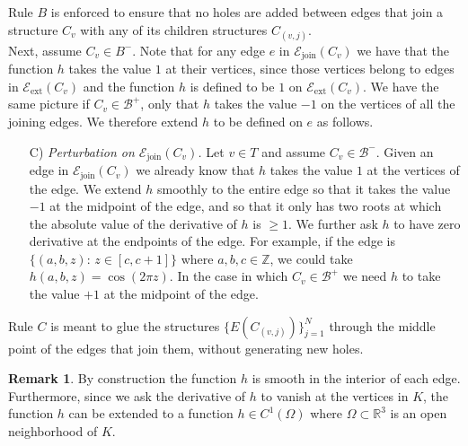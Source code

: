 \documentclass[11pt,reqno]{amsart}
\newcommand{\R}{{\mathbb R}}
\newcommand{\Z}{{\mathbb Z}}
\theoremstyle{definition}
\newtheorem{remark}{Remark}
\begin{document}
\noindent Rule $B$ is enforced to ensure that no holes are added between edges that join a structure $C_v$ with any of its children structures $C_{(v,j)}$.\\

Next, assume $C_v \mathcal \in B^-$. Note that for any edge $e$ in  $\mathcal E_{\text{join}}(C_v)$ we  have that the function $h$ takes the value $1$ at their vertices, since those vertices belong to edges in $ \mathcal E_{\text{ext}}(C_v)$ and the function $h$ is defined to be $1$ on $ \mathcal E_{\text{ext}}(C_v)$. We have the same picture if  $C_v \in \mathcal B^+$, only that $h$ takes the value $-1$ on the vertices of all the joining edges. We therefore extend $h$  to be defined on $e$ as follows.\\

\begin{itemize}
\item[C)]   \emph{Perturbation on $\mathcal E_{\text{join}} (C_v)$.} Let $v \in T$ and assume $C_v \in \mathcal B^-$.  Given an edge in  $\mathcal E_{\text{join}}(C_v)$ we already know that $h$ takes the value $1$ at the vertices of the edge. We extend $h$ smoothly to the entire edge so that it takes the value $-1$ at the midpoint of the edge, and so that  it only has two roots at which the absolute value of the derivative of $h$ is  $\geq 1$. 
We further ask $h$ to have zero derivative at the endpoints of the edge. For example, if the edge is  $\{(a,b,z):\, z\in [c,c+1]\}$ where $a,b,c \in \Z$, we could take
 $h(a,b,z)=\cos(2\pi z)$.  In the case in which $C_v \in \mathcal B^+$  we  need $h$ to take the value $+1$ at the midpoint of the edge.\\
\end{itemize}

\noindent Rule $C$ is meant to glue the structures $\{ E (C_{(v,j)})\}_{j=1}^N$ through the middle point of the edges that join them, without generating new holes.\\

\begin{remark}\label{extension}
By construction the function $h$ is smooth in the interior of each edge. Furthermore, since we ask the derivative of $h$ to vanish at the vertices in $K$, the function $h$ can be extended to a function $h \in C^1(\Omega)$ where $\Omega \subset \R^3$ is an open neighborhood of $K$.
\end{remark}
\end{document}
